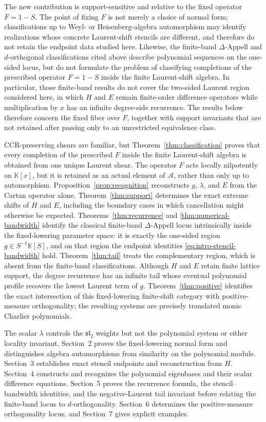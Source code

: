 \documentclass[11pt,reqno]{amsart}
\numberwithin{equation}{section}
\theoremstyle{definition}
\theoremstyle{remark}
\newcommand{\K}{\mathbb K}
\newcommand{\algA}{\mathcal A}
\begin{document}
The new contribution is support-sensitive and relative to the fixed
operator $F=1-S$.  The point of fixing $F$ is not merely a choice of
normal form; classifications up to Weyl- or Heisenberg-algebra
automorphism may identify realizations whose concrete Laurent-shift
stencils are different, and therefore do not retain the endpoint data
studied here. Likewise, the finite-band $\Delta$-Appell and $d$-orthogonal
classifications cited above describe polynomial sequences on the
one-sided locus, but do not formulate the problem of classifying
completions of the prescribed operator $F=1-S$ inside the finite
Laurent-shift algebra. In particular, those finite-band results do not
cover the two-sided Laurent region considered here, in which $H$ and
$E$ remain finite-order difference operators while multiplication by
$x$ has an infinite degree-side recurrence. The results below therefore concern the fixed fiber over $F$, together with support invariants that are not retained after passing only to an unrestricted equivalence class. 

CCR-preserving shears are familiar, but Theorem~\ref{thm:classification} proves that every completion of the prescribed $F$ inside the finite Laurent-shift algebra is obtained from one unique Laurent shear.  The operator $F$ acts locally nilpotently on $\K[x]$, but it is retained as an actual element of $\algA$, rather than only up to automorphism.  Proposition~\ref{prop:recognition} reconstructs $g$, $\lambda$, and $E$ from the Cartan operator alone.  Theorem~\ref{thm:support} determines the exact extreme shifts of $H$ and $E$, including the boundary cases in which cancellation might otherwise be expected. Theorems~\ref{thm:recurrence} and \ref{thm:numerical-bandwidth} identify the classical finite-band $\Delta$-Appell locus intrinsically inside the fixed-lowering parameter space: it is exactly the one-sided region $g\in S^{-1}\K[S]$, and on that region the endpoint identities \eqref{eq:intro-stencil-bandwidth} hold.
Theorem~\ref{thm:tail} treats the complementary region, which is absent from the finite-band classifications.  Although $H$ and $E$ retain finite lattice support, the degree recurrence has an infinite tail whose eventual polynomial profile recovers the lowest Laurent term of $g$. Theorem~\ref{thm:positive} identifies the exact intersection of this fixed-lowering finite-shift category with positive-measure orthogonality; the resulting systems are precisely translated monic Charlier polynomials.

The scalar $\lambda$ controls the $\mathfrak{sl}_2$ weights but not the polynomial system or either locality invariant.  Section~2 proves the fixed-lowering normal form and distinguishes algebra automorphisms from similarity on the polynomial module.  Section~3 establishes exact stencil endpoints and reconstruction from $H$.  Section~4 constructs and recognizes the polynomial eigenbases and their scalar difference equations.  Section~5 proves the recurrence formula, the stencil--bandwidth identities, and the negative-Laurent tail invariant before relating the finite-band locus to $d$-orthogonality.  Section~6 determines the positive-measure orthogonality locus, and Section~7 gives explicit examples.
\end{document}
